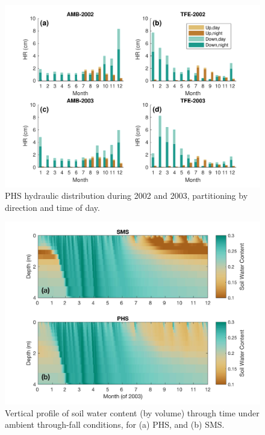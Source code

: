 \documentclass[draft]{agujournal}
\begin{document}
      \begin{figure}[h]
     \centering
     \includegraphics[width=30pc]{figs/hr2}
     \caption{PHS hydraulic distribution during 2002 and 2003, partitioning by direction and time of day.}
     \label{supp:hr}
  \end{figure}
  \clearpage

  
        \clearpage
    \begin{figure}[h]
     \centering
     \includegraphics[width=30pc]{figs/suppsmp.jpg}
     \caption{Vertical profile of soil water content (by volume) through time under ambient through-fall conditions, for
     (a) PHS, and 
     (b) SMS. }
     \label{supp:sm}
  \end{figure}
  
\end{document}
